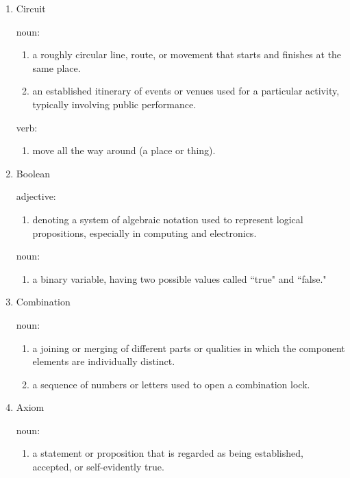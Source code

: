 \documentclass[12pt]{article}
\begin{document}
\begin{enumerate}
    \item Circuit

    noun:

    \begin{enumerate}
        \item a roughly circular line, route, or movement that starts and finishes at the same place.
        \item an established itinerary of events or venues used for a particular activity, typically involving public performance.
    \end{enumerate}

    verb:

    \begin{enumerate}
        \item move all the way around (a place or thing).
    \end{enumerate}

    \item Boolean

    adjective:

    \begin{enumerate}
        \item denoting a system of algebraic notation used to represent logical propositions, especially in computing and electronics.
    \end{enumerate}

    noun:

    \begin{enumerate}
        \item a binary variable, having two possible values called ``true" and ``false."
    \end{enumerate}

    \item{Combination}

    noun:

    \begin{enumerate}
        \item a joining or merging of different parts or qualities in which the component elements are individually distinct.
        \item a sequence of numbers or letters used to open a combination lock.
    \end{enumerate}

    \item{Axiom}

    noun:

    \begin{enumerate}
        \item a statement or proposition that is regarded as being established, accepted, or self-evidently true.
    \end{enumerate}


\end{enumerate}
\end{document}
